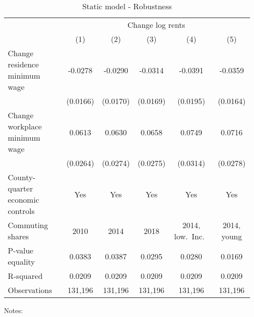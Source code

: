 \begin{table}
    \caption{Static model - Robustness}
    \label{tab:static_expMW_sensitivity}
    \centering

    \begin{tabular}{@{}lccccc@{}}
        \toprule
                                                     & \multicolumn{5}{c}{Change log rents}                               \\ \cmidrule(l){2-6}
                                                     & (1)       & (2)        & (3)        &  (4)        & (5)            \\ \midrule
        Change residence minimum wage             & -0.0278      & -0.0290         & -0.0314       & -0.0391        & -0.0359                 \\
                                                  & (0.0166)    & (0.0170)       & (0.0169)     & (0.0195)      & (0.0164)               \\
        Change workplace minimum wage             & 0.0613      & 0.0630         & 0.0658       & 0.0749        & 0.0716                 \\
                                                  & (0.0264)    & (0.0274)       & (0.0275)     & (0.0314)      & (0.0278)               \\
        County-quarter economic controls               & Yes      &  Yes        & Yes       & Yes        & Yes                 \\
        Commuting shares                               & 2010     &  2014       & 2018    & 2014, low.\ Inc.\    & 2014, young    \\
        P-value equality                          & 0.0383      & 0.0387         & 0.0295       & 0.0280        & 0.0169                 \\
        R-squared                                 & 0.0209      & 0.0209         & 0.0209       & 0.0209        & 0.0209                 \\
        Observations                              & 131,196     & 131,196        & 131,196      & 131,196       & 131,196               \\ \bottomrule
    \end{tabular}

    \begin{minipage}{.95\textwidth} \footnotesize
        \vspace{2mm}
        Notes: 
    \end{minipage}
\end{table}
